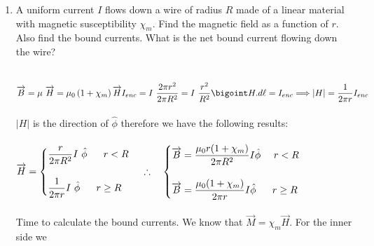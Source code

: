 \documentclass[fleqn]{article}
\begin{document}
\begin{enumerate}
    \item A uniform current $I$ flows down a wire of radius $R$ made of a linear material with magnetic susceptibility $\chi_m$. Find the 
    magnetic field as a function of $r$. Also find the bound currents. What is the net bound current flowing down the wire?

      \textcolor{hwColor}{
        \\
        $
          \overrightarrow{B}=\mu ~ \overrightarrow{H}=\mu_0 \left(1+\chi_m\right) \overrightarrow{H}
          \\
          \\
          \\
          I_{enc}=I ~ \dfrac{2 \pi r^2}{2 \pi R^2}=I ~ \dfrac{r^2}{R^2}
          \\
          \\
          \\
          \bigoint H.d\ell=I_{enc} \Longrightarrow |H|=\dfrac{1}{2 \pi r} I_{enc}
        $
        \\
        \\
        $|H|$ is the direction of $\hat{\phi}$ therefore we have the following results:
        \\
        \\
        $
          \overrightarrow{H}=\begin{cases}
            \dfrac{r}{2 \pi R^2} I ~ \hat{\phi} ~~~~~ r<R
            \\
            \\
            \dfrac{1}{2 \pi r} I ~ \hat{\phi} ~~~~~ r\geq R
          \end{cases}
          \\
          \\
          \\
          \\
          \\
          \therefore ~~~ \begin{cases}
            \overrightarrow{B}=\dfrac{\mu_0 r (1+\chi_m)}{2 \pi R^2} I \hat{\phi} ~~~~ r<R
            \\
            \\
            \overrightarrow{B}=\dfrac{\mu_0 (1+\chi_m)}{2 \pi r} I \hat{\phi} ~~~~~ r\geq R
          \end{cases}
        $
        \\
        \\
        Time to calculate the bound currents. We know that $\overrightarrow{M}=\chi_m \overrightarrow{H}$. For the inner side we 
}
\end{enumerate}
\end{document}
